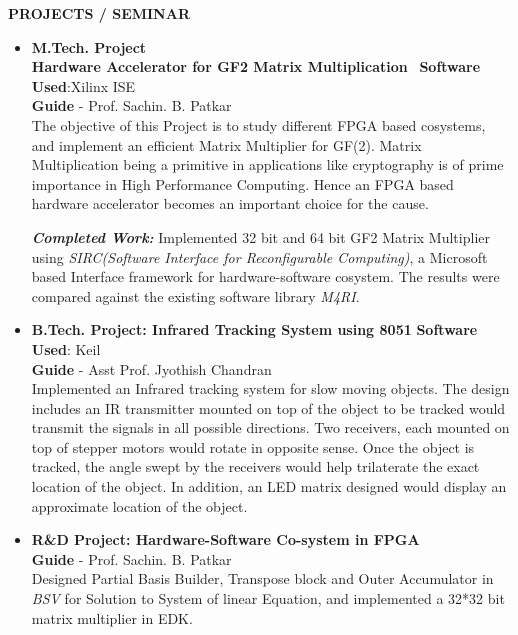 \documentclass[a4paper,10pt]{article}
\begin{document}
 \colorbox{titleColor}{\parbox{6.5in}{\textbf{PROJECTS / SEMINAR}}}

 \begin{itemize}

\setlength{\itemsep}{1pt}
  \item \textbf{{M.Tech. Project}}\\
	\textbf{Hardware Accelerator for GF2 Matrix Multiplication }\qquad\qquad\qquad\ \textbf{Software Used}:Xilinx ISE\\
	{\textbf{Guide} - Prof. Sachin. B. Patkar\\}
	The objective of this Project is to study different FPGA based cosystems, and implement an efficient Matrix Multiplier for GF(2).
	Matrix Multiplication being a primitive in applications like cryptography is of prime importance in High Performance Computing. 
	Hence an FPGA based hardware accelerator becomes an important choice for the cause. 
	
 \textbf{\textit{Completed Work:}} 
   Implemented 32 bit and 64 bit GF2 Matrix Multiplier using \textit{SIRC(Software Interface for Reconfigurable Computing)}, a Microsoft based Interface framework
   for hardware-software cosystem. The results were compared against the existing software library \textit{M4RI}. 



  \item \textbf{{B.Tech. Project: Infrared Tracking System using 8051}}  \qquad\qquad\qquad\qquad \textbf{Software Used}: Keil\\
        {\textbf{Guide} - Asst Prof. Jyothish Chandran\\}                                                   
	Implemented an Infrared tracking system for slow moving objects. The design includes an IR transmitter mounted on top of the 
	object to be tracked would transmit the signals in all possible directions. Two receivers, each mounted on top of stepper motors
	would rotate in opposite sense. Once the object is tracked, the angle swept by the receivers would help trilaterate the exact location of the object.
	In addition, an LED matrix designed would display an approximate location of the object.

  \item \textbf{{R\&D Project: Hardware-Software Co-system in FPGA}}\\
	{\textbf{Guide} - Prof. Sachin. B. Patkar \qquad\qquad\qquad\quad\qquad\qquad\qquad\quad\qquad\qquad\qquad\qquad\qquad\qquad\quad \\}
	Designed Partial Basis Builder, Transpose block and Outer Accumulator in \textit{BSV} for Solution to System of linear Equation, and
	implemented a 32*32 bit matrix multiplier in EDK.
	

\end{itemize}
\end{document}
